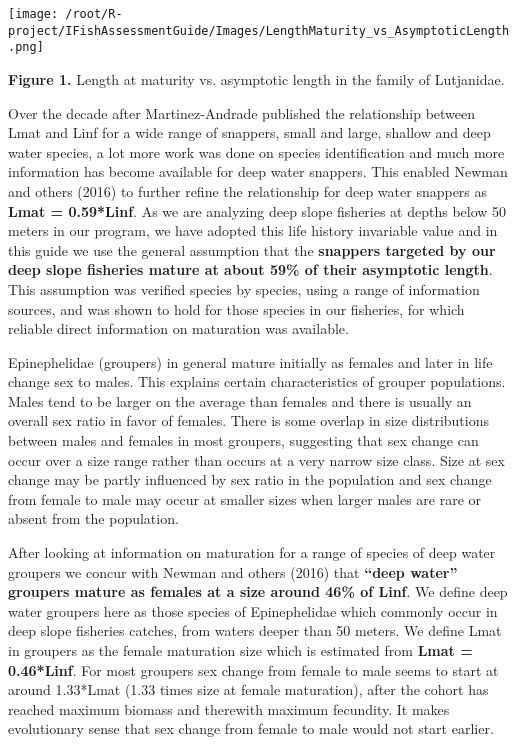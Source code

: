 \begin{center}
\texttt{[image: /root/R-project/IFishAssessmentGuide/Images/LengthMaturity\_vs\_AsymptoticLength.png]}
\end{center}
\textbf{Figure 1.} Length at maturity vs. asymptotic length in the family of Lutjanidae.

Over the decade after Martinez-Andrade published the relationship between Lmat and Linf for a wide range of snappers, small and large, shallow and deep water species, a lot more work was done on species identification and much more information has become available for deep water snappers. This enabled Newman and others (2016) to further refine the relationship for deep water snappers as \textbf{Lmat = 0.59*Linf}. As we are analyzing deep slope fisheries at depths below 50 meters in our program, we have adopted this life history invariable value and in this guide we use the general assumption that the \textbf{snappers targeted by our deep slope fisheries mature at about 59\% of their asymptotic length}. This assumption was verified species by species, using a range of information sources, and was shown to hold for those species in our fisheries, for which reliable direct information on maturation was available.

Epinephelidae (groupers) in general mature initially as females and later in life change sex to males. This explains certain characteristics of grouper populations. Males tend to be larger on the average than females and there is usually an overall sex ratio in favor of females. There is some overlap in size distributions between males and females in most groupers, suggesting that sex change can occur over a size range rather than occurs at a very narrow size class. Size at sex change may be partly influenced by sex ratio in the population and sex change from female to male may occur at smaller sizes when larger males are rare or absent from the population.

After looking at information on maturation for a range of species of deep water groupers we concur with Newman and others (2016) that \textbf{``deep water'' groupers mature as females at a size around 46\% of Linf}. We define deep water groupers here as those species of Epinephelidae which commonly occur in deep slope fisheries catches, from waters deeper than 50 meters. We define Lmat in groupers as the female maturation size which is estimated from \textbf{Lmat = 0.46*Linf}. For most groupers sex change from female to male seems to start at around 1.33*Lmat (1.33 times size at female maturation), after the cohort has reached maximum biomass and therewith maximum fecundity. It makes evolutionary sense that sex change from female to male would not start earlier.
 
